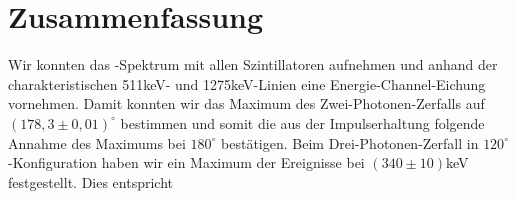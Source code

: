 \section{Zusammenfassung}

Wir konnten das \Na-Spektrum mit allen Szintillatoren aufnehmen und anhand der charakteristischen 511keV- und 1275keV-Linien eine Energie-Channel-Eichung vornehmen. Damit konnten wir das Maximum des Zwei-Photonen-Zerfalls auf $(178,3 \pm 0,01)^\circ$ bestimmen und somit die aus der Impulserhaltung folgende Annahme des Maximums bei $180^\circ$ bestätigen. Beim Drei-Photonen-Zerfall in $120^\circ$-Konfiguration haben wir ein Maximum der Ereignisse bei $(340 \pm 10)$keV festgestellt. Dies entspricht 